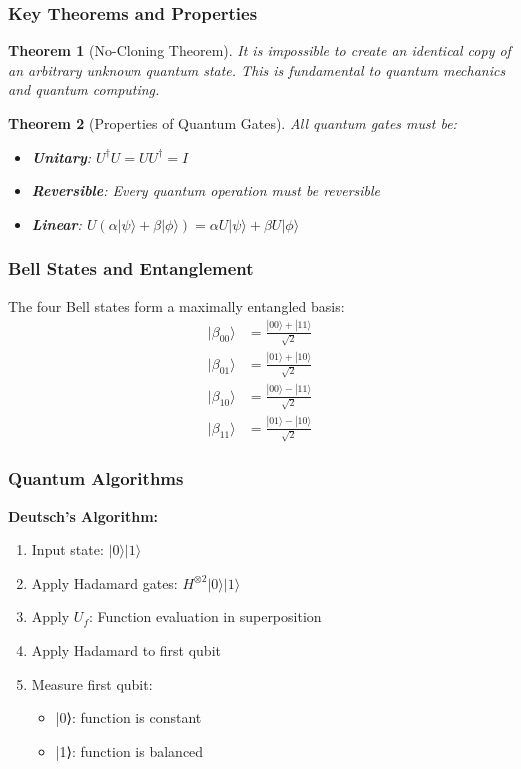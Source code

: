 \documentclass{article}
\newtheorem{theorem}{Theorem}[subsection]
\begin{document}
\subsubsection{Key Theorems and Properties}
\begin{theorem}[No-Cloning Theorem]
It is impossible to create an identical copy of an arbitrary unknown quantum state. This is fundamental to quantum mechanics and quantum computing.
\end{theorem}

\begin{theorem}[Properties of Quantum Gates]
All quantum gates must be:
\begin{itemize}
    \item \textbf{Unitary}: \(U^{\dagger}U = UU^{\dagger} = I\)
    \item \textbf{Reversible}: Every quantum operation must be reversible
    \item \textbf{Linear}: \(U(\alpha|\psi\rangle + \beta|\phi\rangle) = \alpha U|\psi\rangle + \beta U|\phi\rangle\)
\end{itemize}
\end{theorem}

\subsubsection{Bell States and Entanglement}
The four Bell states form a maximally entangled basis:
\begin{align*}
|\beta_{00}\rangle &= \frac{|00\rangle + |11\rangle}{\sqrt{2}} \\
|\beta_{01}\rangle &= \frac{|01\rangle + |10\rangle}{\sqrt{2}} \\
|\beta_{10}\rangle &= \frac{|00\rangle - |11\rangle}{\sqrt{2}} \\
|\beta_{11}\rangle &= \frac{|01\rangle - |10\rangle}{\sqrt{2}}
\end{align*}

\subsubsection{Quantum Algorithms}
\begin{conceptbox}
\textbf{Deutsch's Algorithm:}
\begin{enumerate}
    \item Input state: \(|0\rangle|1\rangle\)
    \item Apply Hadamard gates: \(H^{\otimes 2}|0\rangle|1\rangle\)
    \item Apply \(U_f\): Function evaluation in superposition
    \item Apply Hadamard to first qubit
    \item Measure first qubit:
    \begin{itemize}
        \item |0⟩: function is constant
        \item |1⟩: function is balanced
    \end{itemize}
\end{enumerate}
\end{conceptbox}
\end{document}
